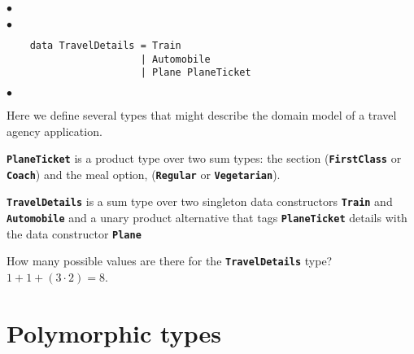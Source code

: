 \documentclass[12pt]{article}
\newcommand\code[1]{\texttt{\textbf{#1}}}
\newenvironment{notelist}{\begin{list}
   {$\bullet$}
   {\setlength{\itemsep}{0in}}}
   {\end{list}}
\begin{document}
\begin{notelist}
\begin{notelist}
\begin{lstlisting}
    data TravelDetails = Train
                       | Automobile
                       | Plane PlaneTicket
    \end{lstlisting}
    \begin{notelist}
        \item Here we define several types that might describe the domain model of a travel agency application.
        \item \code{PlaneTicket} is a product type over two sum types: the section (\code{FirstClass} or \code{Coach}) and the meal option,
              (\code{Regular} or \code{Vegetarian}).
        \item \code{TravelDetails} is a sum type over two singleton data constructors \code{Train} and \code{Automobile} and a unary
              product alternative that tags \code{PlaneTicket} details with the data constructor \code{Plane}
        \item How many possible values are there for the \code{TravelDetails} type? $1 + 1 + (3 \cdot 2) = 8$.
    \end{notelist}
\end{notelist}
\end{notelist}

\section{Polymorphic types}
\end{document}
